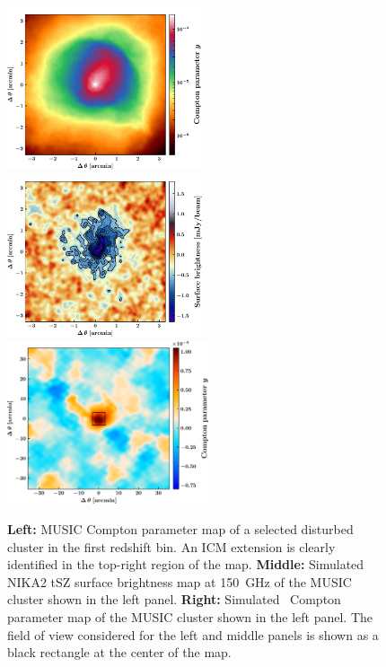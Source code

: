 \documentclass[twocolumn,traditabstract]{aa}
\begin{document}
\begin{figure}[h!]
\centering
\includegraphics[height=4.8cm]{Simu_NK2_Pla_maps1.pdf}
\hspace{0.3cm}
\includegraphics[height=4.8cm]{Simu_NK2_Pla_maps2.pdf}
\hspace{0.3cm}
\includegraphics[height=4.8cm]{Simu_NK2_Pla_maps3.pdf}
\caption{{\footnotesize \textbf{Left:} MUSIC Compton parameter map of a selected disturbed cluster in the first redshift bin. An ICM extension is clearly identified in the top-right region of the map.  \textbf{Middle:} Simulated NIKA2 tSZ surface brightness map at 150~GHz of the MUSIC cluster shown in the left panel. \textbf{Right:} Simulated \planck\ Compton parameter map of the MUSIC cluster shown in the left panel. The field of view considered for the left and middle panels is shown as a black rectangle at the center of the map.}}
\label{fig:simu_nk2_pla_maps}
\end{figure}
\end{document}
